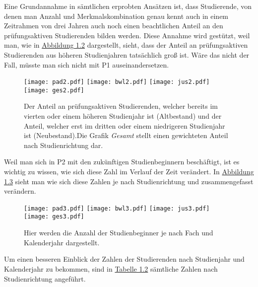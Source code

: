 Eine Grundannahme in s\"amtlichen erprobten Ans\"atzen ist, dass Studierende, von denen man Anzahl und Merkmalskombination genau kennt auch in einem Zeitrahmen von
drei Jahren auch noch einen beachtlichen Anteil an den pr\"ufungsaktiven Studierenden bilden werden. Diese Annahme wird gest\"utzt, weil man, wie in \hyperref[fig:abb2]{Abbildung 1.2}
dargestellt, sieht, dass der Anteil an pr\"ufungsaktiven Studierenden aus h\"oheren Studienjahren tats\"achlich gro{\ss} ist. W\"are das nicht der Fall, m\"usste man sich nicht mit
P1 auseinandersetzen.

\begin{figure}[ht]
  \label{fig:abb2}
  \texttt{[image: pad2.pdf]}
  \texttt{[image: bwl2.pdf]}
  \texttt{[image: jus2.pdf]}
  \texttt{[image: ges2.pdf]}
  \caption[Anteile des Neu- und Altbestandes an aktiven Studierenden]{Der Anteil an prüfungsaktiven Studierenden, welcher bereits im vierten oder einem höheren
    Studienjahr ist (Altbestand) und der Anteil, welcher erst im dritten oder einem niedrigeren Studienjahr ist (Neubestand).Die Grafik \textit{Gesamt} stellt einen gewichteten
    Anteil nach Studienrichtung dar.}
\end{figure}

Weil man sich in P2 mit den zuk\"unftigen Studienbeginnern besch\"aftigt, ist es wichtig zu wissen, wie sich diese Zahl im Verlauf der Zeit ver\"andert. In
\hyperref[fig:abb3]{Abbildung 1.3} sieht man wie sich diese Zahlen je nach Studienrichtung und zusammengefasst ver\"andern.

\begin{figure}[ht]
  \label{fig:abb3}
  \texttt{[image: pad3.pdf]}
  \texttt{[image: bwl3.pdf]}
  \texttt{[image: jus3.pdf]}
  \texttt{[image: ges3.pdf]}
  \caption[Anzahl der Studienbeginner nach Fach und Kalenderjahr]{Hier werden die Anzahl der Studienbeginner je nach Fach und Kalenderjahr dargestellt.}
\end{figure}

Um einen besseren Einblick der Zahlen der Studierenden nach Studienjahr und Kalenderjahr zu bekommen, sind in \hyperref[tab:numbers]{Tabelle 1.2} s\"amtliche
Zahlen nach Studienrichtung angef\"uhrt.

